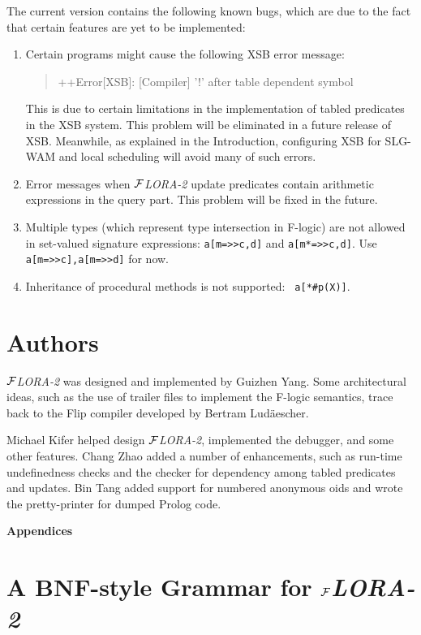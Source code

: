 \documentclass[11pt]{article}
\newcommand{\FLIP}{{\mbox{\sc Flip}}\xspace}
\newcommand{\FLORA}{{\mbox{${\cal F}${\small\it LORA}\rm\emph{-2}}}\xspace}
\newcommand{\fl}{\mbox{F-logic}\xspace}
\begin{document}
The current version contains the following known bugs, which are due to the
fact that certain features are yet to be implemented:
\begin{enumerate}
  \item  Certain programs might cause the following XSB error message:
    \begin{quote}
     ++Error[XSB]: [Compiler] '!' after table dependent symbol 
    \end{quote}
    This is due to certain limitations in the implementation of tabled
    predicates in the XSB system. This problem will be eliminated in a
    future release of XSB. Meanwhile, as explained in the Introduction,
    configuring XSB for SLG-WAM and local scheduling will avoid many of
    such errors.
  \item Error messages when \FLORA update predicates contain arithmetic
    expressions in the query part. This problem will be fixed in the
    future.
  \item Multiple types (which represent type intersection in \fl) are not
    allowed in set-valued signature expressions: {\tt a[m=>>{c,d}]} and
    {\tt a[m*=>>{c,d}]}. Use {\tt a[m=>>c],a[m=>>d]} for now.
  \item Inheritance of procedural methods is not supported: {\tt
      a[*\#p(X)]}.
\end{enumerate}

\section{Authors}
\FLORA was designed and implemented by Guizhen Yang. Some architectural
ideas, such as the use of trailer files to implement the F-logic semantics,
trace back to the \FLIP compiler developed by Bertram Lud\"aescher.

Michael Kifer helped design \FLORA, implemented the debugger, and some
other features. Chang Zhao added a number of enhancements, such as run-time
undefinedness checks and the checker for dependency among tabled predicates
and updates. Bin Tang added support for numbered anonymous oids and wrote the
pretty-printer for dumped Prolog code.


\appendix

\newpage

\noindent
{\LARGE\bf Appendices}

\section{A BNF-style Grammar for \FLORA}\label{app-bnf}
\end{document}
